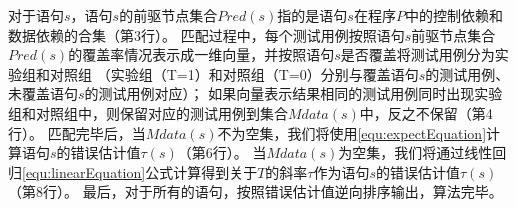 对于语句$s$，语句$s$的前驱节点集合$Pred(s)$指的是语句$s$在程序$P$中的控制依赖和数据依赖的合集（第3行）。
匹配过程中，每个测试用例按照语句$s$前驱节点集合$Pred(s)$的覆盖率情况表示成一维向量，并按照语句$s$是否覆盖将测试用例分为实验组和对照组
（实验组（T=1）和对照组（T=0）分别与覆盖语句$s$的测试用例、未覆盖语句$s$的测试用例对应）；
如果向量表示结果相同的测试用例同时出现实验组和对照组中，则保留对应的测试用例到集合$Mdata(s)$中，反之不保留（第4行）。
匹配完毕后，当$Mdata(s)$不为空集，我们将使用\autoref{equ:expectEquation}计算语句$s$的错误估计值$\tau(s)$（第6行）。
当$Mdata(s)$为空集，我们将通过线性回归\autoref{equ:linearEquation}公式计算得到关于$T$的斜率$\tau$作为语句$s$的错误估计值$\tau(s)$（第8行）。
最后，对于所有的语句，按照错误估计值逆向排序输出，算法完毕。




